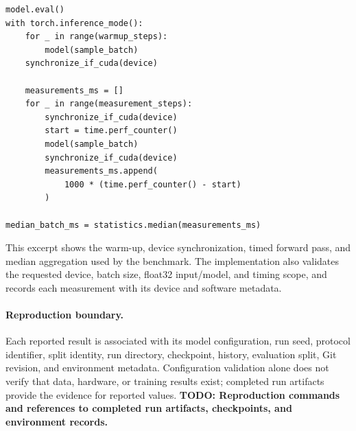 \documentclass[11pt,a4paper]{article}
\begin{document}
\begin{lstlisting}[caption={Core of the forward-only inference timing loop.},label={lst:timing}]
model.eval()
with torch.inference_mode():
    for _ in range(warmup_steps):
        model(sample_batch)
    synchronize_if_cuda(device)

    measurements_ms = []
    for _ in range(measurement_steps):
        synchronize_if_cuda(device)
        start = time.perf_counter()
        model(sample_batch)
        synchronize_if_cuda(device)
        measurements_ms.append(
            1000 * (time.perf_counter() - start)
        )

median_batch_ms = statistics.median(measurements_ms)
\end{lstlisting}

This excerpt shows the warm-up, device synchronization, timed forward pass, and median aggregation used by the benchmark. The implementation also validates the requested device, batch size, float32 input/model, and timing scope, and records each measurement with its device and software metadata.

\paragraph{Reproduction boundary.} Each reported result is associated with its model configuration, run seed, protocol identifier, split identity, run directory, checkpoint, history, evaluation split, Git revision, and environment metadata. Configuration validation alone does not verify that data, hardware, or training results exist; completed run artifacts provide the evidence for reported values. \textbf{TODO: Reproduction commands and references to completed run artifacts, checkpoints, and environment records.}
\end{document}
